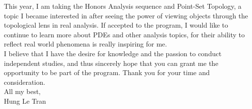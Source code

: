 \documentclass[a4paper, 11pt]{extarticle}
\begin{document}
This year, I am taking the Honors Analysis sequence and Point-Set Topology, a topic I became interested in after seeing the power of viewing objects through the topological lens in real analysis. If accepted to the program, I would like to continue to learn more about PDEs and other analysis topics, for their ability to reflect real world phenomena is really inspiring for me.\\

I believe that I have the desire for knowledge and the passion to conduct independent studies, and thus sincerely hope that you can grant me the opportunity to be part of the program. Thank you for your time and consideration.\\

All my best,\\

Hung Le Tran
\end{document}
